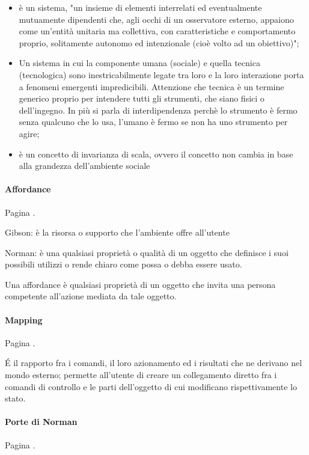 \documentclass[11pt,a4paper]{book}
\begin{document}
\begin{itemize}
	\item è un sistema, "un insieme di elementi interrelati ed eventualmente mutuamente dipendenti che, agli occhi di un osservatore esterno, appaiono come un'entità unitaria ma collettiva, con caratteristiche e comportamento proprio, solitamente autonomo ed intenzionale (cioè volto ad un obiettivo)";
	\item Un sistema in cui la componente umana  (sociale) e quella tecnica (tecnologica) sono inestricabilmente legate tra loro e la loro interazione porta a fenomeni emergenti impredicibili. Attenzione che tecnica è un termine generico proprio per intendere tutti gli strumenti, che siano fisici o dell'ingegno. In più si parla di interdipendenza perchè lo strumento è fermo senza qualcuno che lo usa, l'umano è fermo se non ha uno strumento per agire;
	\item è un concetto di invarianza di scala, ovvero il concetto non cambia in base alla grandezza dell'ambiente sociale
\end{itemize}

\paragraph{Affordance}
Pagina \pageref{par: affordance}.

Gibson: è la risorsa o supporto che l'ambiente offre all'utente

Norman: è una qualsiasi proprietà o qualità di un oggetto che definisce i suoi possibili utilizzi o rende chiaro come possa o debba essere usato.

Una affordance è qualsiasi proprietà di un oggetto che invita una persona competente all'azione mediata da tale oggetto.

\paragraph{Mapping}
Pagina \pageref{par: mapping}.

É il rapporto fra i comandi, il loro azionamento ed i risultati che ne derivano nel mondo esterno; permette all’utente di creare un collegamento diretto fra i comandi di controllo e le parti dell’oggetto di cui modificano rispettivamente lo stato.
\paragraph{Porte di Norman}
Pagina \pageref{par: porta di norman}.
\end{document}
